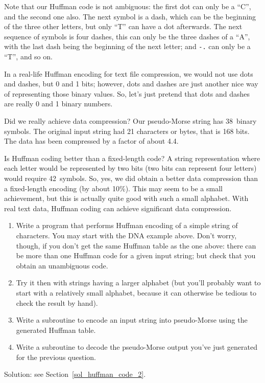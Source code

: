 Note that our Huffman code is not ambiguous: the first dot can 
only be a ``C'', and the second one also. The next symbol is a 
dash, which can be the beginning of the three other letters, but 
only ``T'' can have a dot afterwards. The next sequence of 
symbols is four dashes, this can only be the three dashes of a 
``A'', with the last dash being the beginning of the next letter; 
and \verb'-.' can only be a ``T'', and so on.

In a real-life Huffman encoding for text file compression, 
we would not use dots and dashes, but 0 and 1 bits; however,  
dots and dashes are just another nice way of representing 
those binary values. So, let's just pretend that dots and dashes 
are really 0 and 1 binary numbers.

Did we really achieve data compression? Our pseudo-Morse string has 
38~binary symbols. The original input string had 21 characters 
or bytes, that is 168 bits. The data has been compressed by a 
factor of about 4.4. 

Is Huffman coding better than a fixed-length code? A string 
representation where each letter would be represented by two 
bits (two bits can represent four letters) would require 
42~symbols. So, yes, we did obtain a better data compression 
than a fixed-length encoding (by about 10\%). This may seem 
to be a small achievement, but this is actually quite good with 
such a small alphabet. With real text data, Huffman coding can 
achieve significant data compression.


\begin{exercise}
\label{huffman_code_2}
\begin{enumerate}
\item Write a program that performs Huffman encoding of a simple string 
of characters. You may start with the DNA example above. Don't 
worry, though, if you don't get the same Huffman table as the one 
above: there can be more than one Huffman code for a given input 
string; but check that you obtain an unambiguous code. 
\item Try it 
then with strings having a larger alphabet (but you'll probably 
want to start with a relatively small alphabet, because it can 
otherwise be tedious to check the result by hand).
\item Write a subroutine to encode an input string into 
pseudo-Morse using the generated Huffman table.
\item Write a subroutine to decode the pseudo-Morse output 
you've just generated for the previous question.
\end{enumerate}
%
Solution: see Section~\ref{sol_huffman_code_2}.
\end{exercise}

